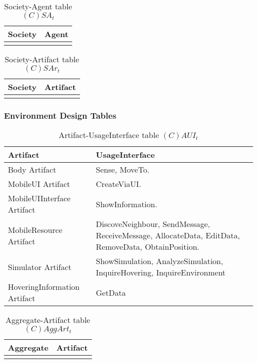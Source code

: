 \begin{table}[H]
	\centering
	\begin{tabular}{|p{4cm}|p{8cm}|}
			\hline
			\textbf{Society} & \textbf{Agent} \\
			\hline
			& \\
			\hline
		\end{tabular}
	\caption{Society-Agent table $(C)SA_t$}
	\label{tab:csat}
\end{table}

\begin{table}[H]
	\centering
	\begin{tabular}{|p{4cm}|p{8cm}|}
			\hline
			\textbf{Society} & \textbf{Artifact} \\
			\hline
			& \\
			\hline
		\end{tabular}
	\caption{Society-Artifact table $(C)SAr_t$}
	\label{tab:csart}
\end{table}

\subsubsection{Environment Design Tables}

\begin{table}[H]
	\centering
	\begin{tabular}{|p{4cm}|p{8cm}|}
			\hline
			\textbf{Artifact} & \textbf{UsageInterface} \\
			\hline
			Body Artifact & Sense, MoveTo. \\
			\hline
			MobileUI Artifact & CreateViaUI. \\
			\hline
			MobileUIInterface Artifact & ShowInformation. \\
			\hline
      MobileResource Artifact & DiscoveNeighbour, SendMessage, ReceiveMessage,
      AllocateData, EditData, RemoveData, ObtainPosition. \\
			\hline
      Simulator Artifact & ShowSimulation, AnalyzeSimulation, InquireHovering,
      InquireEnvironment \\
			\hline
			HoveringInformation Artifact & GetData \\
			\hline
		\end{tabular}
	\caption{Artifact-UsageInterface table $(C)AUI_t$}
	\label{tab:cauit}
\end{table}

\begin{table}[H]
	\centering
	\begin{tabular}{|p{4cm}|p{8cm}|}
			\hline
			\textbf{Aggregate} & \textbf{Artifact} \\
			\hline
			& \\
			\hline
		\end{tabular}
	\caption{Aggregate-Artifact table $(C)AggArt_t$}
	\label{tab:caggartt}
\end{table}

